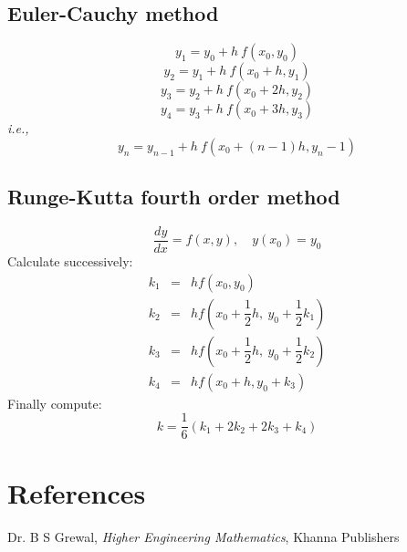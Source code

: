 \documentclass[12pt,a4paper,landscape]{article}
\newcommand{\dydx}{\dfrac{dy}{dx}}
\begin{document}
	\subsection{Euler-Cauchy method}
	\[ y_1 = y_0 + h\ f(x_0 , y_0) \]
	\[ y_2 = y_1 + h\ f(x_0 + h, y_1)\]
	\[ y_3 = y_2 + h\ f(x_0 + 2h, y_2)\]
	\[ y_4 = y_3 + h\ f(x_0 + 3h, y_3)\]
		\emph{i.e.,}
	\begin{equation}\label{Euler}
	y_n = y_{n-1} + h\ f\left( x_0 + (n-1) h, y_n-1 \right)
	\end{equation}
	
	
	\subsection{Runge-Kutta fourth order method}
	\[ \dydx = f(x,y),\quad y(x_0) = y_0 \]
	Calculate successively:
	\begin{eqnarray}
		k_1 &=& hf\left(x_0,y_0\right)\\
		k_2 &=& hf\left(x_0 + \dfrac{1}{2}h,\ y_0 + \dfrac{1}{2}k_1\right)\\
		k_3 &=& hf\left(x_0 + \dfrac{1}{2}h,\ y_0 + \dfrac{1}{2}k_2\right)\\
		k_4 &=& hf\left(x_0 + h, y_0 + k_3\right)
	\end{eqnarray}
	Finally compute:
	\begin{equation}\label{RungeKutta}
		k = \dfrac{1}{6}\left(k_1 + 2k_2 + 2k_3 + k_4\right)
	\end{equation}
	\section*{References}
	Dr. B S Grewal, \textit{Higher Engineering Mathematics}, Khanna Publishers
\end{document}
